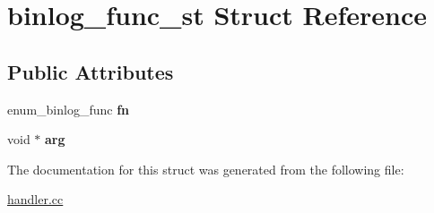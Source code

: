 \hypertarget{structbinlog__func__st}{}\section{binlog\+\_\+func\+\_\+st Struct Reference}
\label{structbinlog__func__st}
\subsection*{Public Attributes}
\begin{DoxyCompactItemize}
\item 
\mbox{\label{structbinlog__func__st_a86a09177e88e085751c252ffcca96683}} 
enum\+\_\+binlog\+\_\+func {\bfseries fn}
\item 
\mbox{\label{structbinlog__func__st_a0906a9abb15b299f0a4a46714934949b}} 
void $\ast$ {\bfseries arg}
\end{DoxyCompactItemize}


The documentation for this struct was generated from the following file\+:\begin{DoxyCompactItemize}
\item 
\mbox{\hyperlink{handler_8cc}{handler.\+cc}}\end{DoxyCompactItemize}
